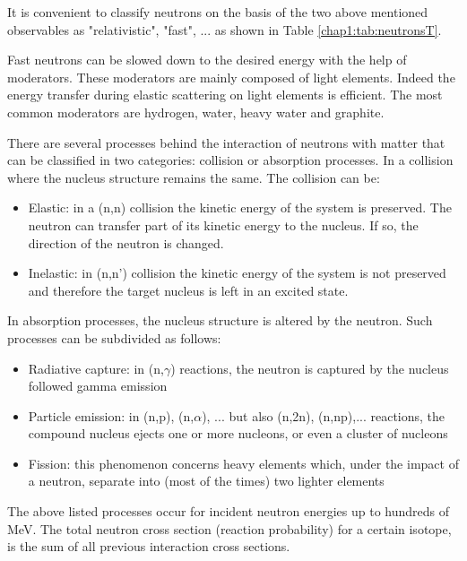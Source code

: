 \begin{refsection}
  It is convenient to classify neutrons on the basis of the two above mentioned observables as "relativistic", "fast", ... as shown in Table \ref{chap1:tab:neutronsT}.

  

  Fast neutrons can be slowed down to the desired energy with the help of moderators. These moderators are mainly composed of light elements. Indeed the energy transfer during elastic scattering on light elements is efficient. The most common moderators are hydrogen, water, heavy water and graphite.

  There are several processes behind the interaction of neutrons with matter \cite{Leo1994} that can be classified in two categories: collision or absorption processes.
  In a collision where the nucleus structure remains the same. The collision can be:
  \begin{itemize}
    \item Elastic: in a (n,n) collision the kinetic energy of the system is preserved. The neutron can transfer part of its kinetic energy to the nucleus. If so, the direction of the neutron is changed.
    \item Inelastic: in (n,n') collision the kinetic energy of the system is not preserved and therefore the target nucleus is left in an excited state.
  \end{itemize}
  In absorption processes, the nucleus structure is altered by the neutron.
  Such processes can be subdivided as follows:
  \begin{itemize}
    \item Radiative capture: in (n,$\gamma$) reactions, the neutron is captured by the nucleus followed gamma emission
    \item Particle emission: in (n,p), (n,$\alpha$), ... but also (n,2n), (n,np),... reactions, the compound nucleus ejects one or more nucleons, or even a cluster of nucleons
    \item Fission: this phenomenon concerns heavy elements which, under the impact of a neutron, separate into (most of the times) two lighter elements
  \end{itemize}

  The above listed processes occur for incident neutron energies up to hundreds of MeV. The total neutron cross section (reaction probability) for a certain isotope, is the sum of all previous interaction cross sections.


\end{refsection}
